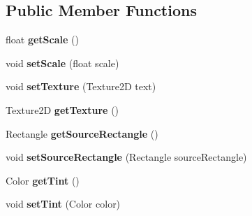 \subsection*{Public Member Functions}
\begin{DoxyCompactItemize}
\item 
\hypertarget{interface_tile_engine_1_1_interfaces_1_1_drawable_a76cc277f0eb55cbb1a5c107a8320f47b}{float {\bfseries get\-Scale} ()}\label{interface_tile_engine_1_1_interfaces_1_1_drawable_a76cc277f0eb55cbb1a5c107a8320f47b}

\item 
\hypertarget{interface_tile_engine_1_1_interfaces_1_1_drawable_a26df4c915e4a9d1c6787ffa0c7ad5596}{void {\bfseries set\-Scale} (float scale)}\label{interface_tile_engine_1_1_interfaces_1_1_drawable_a26df4c915e4a9d1c6787ffa0c7ad5596}

\item 
\hypertarget{interface_tile_engine_1_1_interfaces_1_1_drawable_afb39e791cb98a0f41ed87887887ad31c}{void {\bfseries set\-Texture} (Texture2\-D text)}\label{interface_tile_engine_1_1_interfaces_1_1_drawable_afb39e791cb98a0f41ed87887887ad31c}

\item 
\hypertarget{interface_tile_engine_1_1_interfaces_1_1_drawable_ab20d9642c88ae050c0f19b87dbc72c3a}{Texture2\-D {\bfseries get\-Texture} ()}\label{interface_tile_engine_1_1_interfaces_1_1_drawable_ab20d9642c88ae050c0f19b87dbc72c3a}

\item 
\hypertarget{interface_tile_engine_1_1_interfaces_1_1_drawable_a9ed91958fd7a38f429ab89e8bdd484da}{Rectangle {\bfseries get\-Source\-Rectangle} ()}\label{interface_tile_engine_1_1_interfaces_1_1_drawable_a9ed91958fd7a38f429ab89e8bdd484da}

\item 
\hypertarget{interface_tile_engine_1_1_interfaces_1_1_drawable_a606231997f3ae0bd62a67208ef06660b}{void {\bfseries set\-Source\-Rectangle} (Rectangle source\-Rectangle)}\label{interface_tile_engine_1_1_interfaces_1_1_drawable_a606231997f3ae0bd62a67208ef06660b}

\item 
\hypertarget{interface_tile_engine_1_1_interfaces_1_1_drawable_aa9e7c7ad62d6e48d98d626238f1b3c80}{Color {\bfseries get\-Tint} ()}\label{interface_tile_engine_1_1_interfaces_1_1_drawable_aa9e7c7ad62d6e48d98d626238f1b3c80}

\item 
\hypertarget{interface_tile_engine_1_1_interfaces_1_1_drawable_a262ec54bc4e01df1f853d6de50787630}{void {\bfseries set\-Tint} (Color color)}\label{interface_tile_engine_1_1_interfaces_1_1_drawable_a262ec54bc4e01df1f853d6de50787630}


\end{DoxyCompactItemize}
